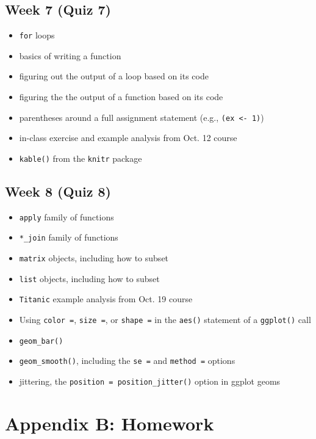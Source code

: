 \documentclass[]{book}
\providecommand{\tightlist}{%
  \setlength{\itemsep}{0pt}\setlength{\parskip}{0pt}}
\begin{document}
\section{Week 7 (Quiz 7)}\label{week-7-quiz-7}

\begin{itemize}
\tightlist
\item
  \texttt{for} loops
\item
  basics of writing a function
\item
  figuring out the output of a loop based on its code
\item
  figuring the the output of a function based on its code
\item
  parentheses around a full assignment statement (e.g.,
  \texttt{(ex\ \textless{}-\ 1)})
\item
  in-class exercise and example analysis from Oct. 12 course
\item
  \texttt{kable()} from the \texttt{knitr} package
\end{itemize}

\section{Week 8 (Quiz 8)}\label{week-8-quiz-8}

\begin{itemize}
\tightlist
\item
  \texttt{apply} family of functions
\item
  \texttt{*\_join} family of functions
\item
  \texttt{matrix} objects, including how to subset
\item
  \texttt{list} objects, including how to subset
\item
  \texttt{Titanic} example analysis from Oct. 19 course
\item
  Using \texttt{color\ =}, \texttt{size\ =}, or \texttt{shape\ =} in the
  \texttt{aes()} statement of a \texttt{ggplot()} call
\item
  \texttt{geom\_bar()}
\item
  \texttt{geom\_smooth()}, including the \texttt{se\ =} and
  \texttt{method\ =} options
\item
  jittering, the \texttt{position\ =\ position\_jitter()} option in
  ggplot geoms
\end{itemize}

\chapter{Appendix B: Homework}\label{appendix-b-homework}
\end{document}
